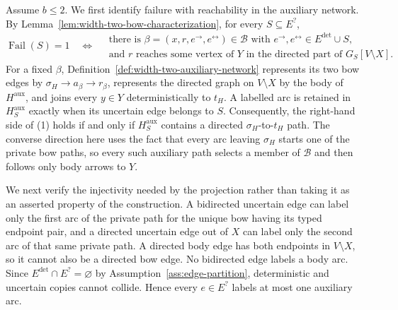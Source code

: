 Assume \(b\leq 2\).  We first identify failure with reachability in the auxiliary network.  By Lemma~\ref{lem:width-two-bow-characterization}, for every \(S\subseteq E^{?}\),
\[
 \operatorname{Fail}(S)=1
 \quad\Longleftrightarrow\quad
 \begin{gathered}
 \text{there is }\beta=(x,r,e^{\to},e^{\leftrightarrow})\in\mathcal B
 \text{ with }e^{\to},e^{\leftrightarrow}\in E^{\mathrm{det}}\cup S,\\
 \text{and }r\text{ reaches some vertex of }Y
 \text{ in the directed part of }G_S[V\setminus X].
 \end{gathered}
\tag{1}
\]
For a fixed \(\beta\), Definition~\ref{def:width-two-auxiliary-network} represents its two bow edges by
\(\sigma_H\to a_\beta\to r_\beta\), represents the directed graph on \(V\setminus X\) by the body of \(H^{\mathrm{aux}}\), and joins every \(y\in Y\) deterministically to \(t_H\).  A labelled arc is retained in \(H^{\mathrm{aux}}_S\) exactly when its uncertain edge belongs to \(S\).  Consequently, the right-hand side of (1) holds if and only if \(H^{\mathrm{aux}}_S\) contains a directed \(\sigma_H\)-to-\(t_H\) path.  The converse direction here uses the fact that every arc leaving \(\sigma_H\) starts one of the private bow paths, so every such auxiliary path selects a member of \(\mathcal B\) and then follows only body arrows to \(Y\).

We next verify the injectivity needed by the projection rather than taking it as an asserted property of the construction.  A bidirected uncertain edge can label only the first arc of the private path for the unique bow having its typed endpoint pair, and a directed uncertain edge out of \(X\) can label only the second arc of that same private path.  A directed body edge has both endpoints in \(V\setminus X\), so it cannot also be a directed bow edge.  No bidirected edge labels a body arc.  Since \(E^{\mathrm{det}}\cap E^{?}=\varnothing\) by Assumption~\ref{ass:edge-partition}, deterministic and uncertain copies cannot collide.  Hence every \(e\in E^{?}\) labels at most one auxiliary arc.

